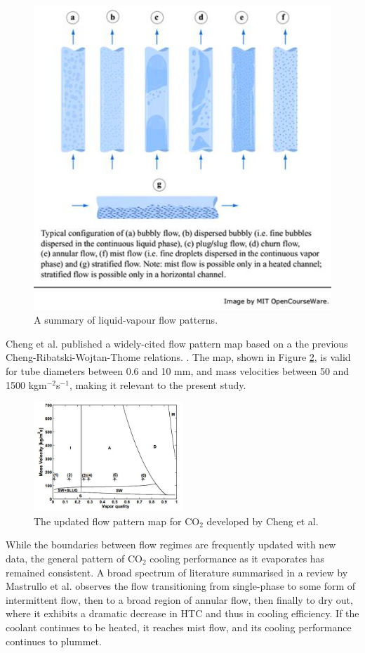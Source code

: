 \documentclass{report}
\begin{document}
\begin{figure}
\includegraphics[width=\textwidth]{flowPatterns}
\caption{A summary of liquid-vapour flow patterns. \cite{MIT}}
\label{fig:flowPatterns}
\end{figure}

Cheng et al. published a widely-cited flow pattern map based on a the previous Cheng-Ribatski-Wojtan-Thome relations. \cite{Cheng 2008}. The map, shown in Figure \ref{fig:chengMap}, is valid for tube diameters between 0.6 and 10 mm, and mass velocities between 50 and 1500 kgm$^{-2}$s$^{-1}$, making it relevant to the present study.\\
\begin{figure}
\includegraphics[width=0.5\textwidth]{chengMap}
\caption{The updated flow pattern map for CO$_2$ developed by Cheng et al. \cite{Cheng 2008}}
\label{fig:chengMap}
\end{figure}
While the boundaries between flow regimes are frequently updated with new data, the general pattern of CO$_2$ cooling performance as it evaporates has remained consistent. A broad spectrum of literature summarised in a review by Mastrullo et al. \cite{Mastrullo 2010} observes the flow transitioning from single-phase to some form of intermittent flow, then to a broad region of annular flow, then finally to dry out, where it exhibits a dramatic decrease in HTC and thus in cooling efficiency. If the coolant continues to be heated, it reaches mist flow, and its cooling performance continues to plummet. 
\end{document}
